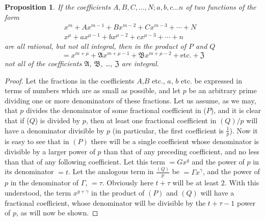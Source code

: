 \documentclass{book}
\theoremstyle{plain}
\newtheorem{proposition}{Proposition}
\theoremstyle{remark}
\begin{document}
\begin{proposition} If the coefficients $A,B,C,\dots, N ; a,b,c \dots n$ of two functions of the form
\begin{align} x^m + A x^{m-1} + B x^{m-2} + Cx^{m-3} + \cdots + N & \tag{$P$} \\
x^{\mu} + a x^{\mu-1} + bx^{\mu-2} + cx^{\mu-3} + \cdots + n & \tag{$Q$} \end{align}
are all rational, but not all integral, then in the product of $P$ and $Q$ 
\[ = x^{m+\mu} + \mathfrak{A} x^{m+\mu-1} + \mathfrak{B} x^{m+\mu - 2} + \textrm{etc.} + \mathfrak{Z} \]
not all of the coefficients $\mathfrak{A}$, $\mathfrak{B}$, \dots, $\mathfrak{Z}$ are integral.
\end{proposition}
\begin{proof}
Let the fractions in the coefficients $A$,$B$ etc., $a$, $b$ etc. be expressed in terms of numbers which are as small as possible, and let $p$ be an arbitrary prime dividing one or more denominators of these fractions.  Let us assume, as we may, that $p$ divides the denominator of some fractional coefficient in ($P$), and it is clear that if ($Q$) is divided by $p$, then at least one fractional coefficient in $(Q)/p$ will have a denominator divisible by $p$ (in particular, the first coefficient is $\frac{1}{p}$).  Now it is easy to see that in $(P)$ there will be a single coefficient whose denominator is divisible by a larger power of $p$ than that of any preceding coefficient, and no less than that of any following coefficient.  Let this term $=Gx^g$ and the power of $p$ in its denominator $=t$. Let the analogous term in $\frac{(Q)}{p}$ be $=\Gamma x^{\gamma}$, and the power of $p$ in the denominator of $\Gamma$, $=\tau$.   Obviously here $t + \tau$ will be at least $2$.  With this understood, the term $x^{g+\gamma}$ in the product of $(P)$ and $(Q)$ will have a fractional coefficient, whose denominator will be divisible by the $t + \tau - 1$ power of $p$, as will now be shown.


\end{proof}
\end{document}
